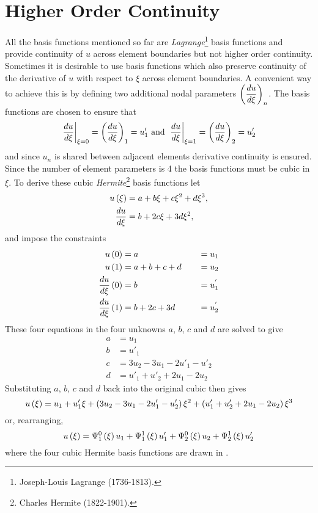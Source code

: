 \section{Higher Order Continuity}
All the basis functions mentioned so far are \emph{Lagrange}\footnote{Joseph-Louis
Lagrange (1736-1813).} basis functions and provide continuity of $u$ across element boundaries 
but not higher order continuity.  Sometimes it is desirable to use basis
functions which also preserve continuity of the derivative of $u$ with respect
to $\xi$ across element boundaries. A convenient way to achieve this is by
defining two additional nodal parameters $\left(  \dfrac{ d u}{d \xi}  \right)_{n}$.  The basis
functions are chosen to ensure that 
\begin{equation*}
  \left.  \dfrac{ d u}{d \xi}  \right|_{\xi=0}  =\left(  \dfrac{ d u}{d \xi}  \right)_{1} = u'_{1} \text{ and }
  \left.  \dfrac{ d u}{d \xi}  \right|_{\xi=1}  =\left(  \dfrac{ d u}{d \xi}  \right)_{2} = u'_{2}
\end{equation*}
and since $u_n$ is shared between adjacent elements derivative continuity is 
ensured.  Since the number of element parameters is 4 the basis functions must
be cubic in $\xi$.  To derive these
cubic \emph{Hermite}\footnote{Charles Hermite (1822-1901).} basis functions
let
\begin{align*}
   u\left( \xi \right)  &= a + b\xi + c\xi^2 + d\xi^3 , \\
   \dfrac{ d u}{d \xi}  &= b + 2c\xi + 3d\xi^2 ,
\end{align*}
and impose the constraints    
\begin{alignat*}{2}
   u\left( 0 \right)  &= a \quad &&= u_{1} \\ 
   u\left( 1 \right)  &= a + b + c + d \quad &&= u_{2} \\
    \dfrac{ d u}{d \xi} \left( 0 \right)  &= b \quad &&= u_{1}^{'}\\
    \dfrac{ d u}{d \xi} \left( 1 \right)  &= b + 2c + 3d \quad &&= u_{2}^{'}
\end{alignat*}
These four equations in the four unknowns $a$, $b$, $c$ and $d$ are solved to
give
\begin{align*}
    a &= u_{1} \\   
    b &= u'_{1} \\
    c &= 3u_{2} - 3u_{1} - 2 u'_{1} -  u'_{2}   \\
    d &= u'_{1} + u'_{2}  + 2u_{1}  - 2u_{2}
\end{align*}
Substituting $a$, $b$, $c$ and $d$ back into the original cubic then gives 
\begin{equation*}
   u\left( \xi \right)  =u_{1} + u'_{1}\xi + \left( 3u_{2} - 3u_{1} - 2u'_{1} -
    u'_{2} \right)\xi^2 + \left( u'_{1} + u'_{2}  + 2u_{1} - 2u_{2} \right)\xi^3 
\end{equation*}
or, rearranging,
\begin{equation}
   u\left( \xi \right)  =   \Psi_{1}^{0} \left( \xi \right)  u_{1} +    \Psi_{1}^{1} \left( \xi \right)  u'_{1} +
     \Psi_{2}^{0} \left( \xi \right)  u_{2} +    \Psi_{2}^{1} \left( \xi \right)  u'_{2} 
  \label{eqn:Hoc}
\end{equation}
where the four cubic Hermite basis functions are drawn in .

